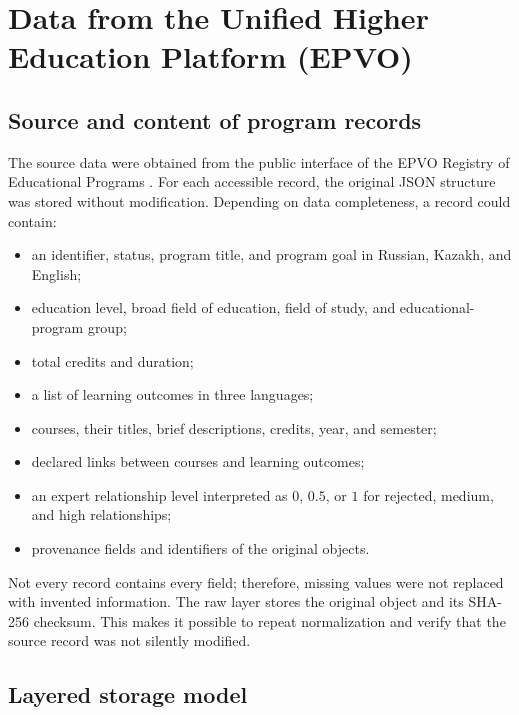 \documentclass[twoside,11pt]{article}
\begin{document}
\section{Data from the Unified Higher Education Platform (EPVO)}

\subsection{Source and content of program records}

The source data were obtained from the public interface of the EPVO Registry of Educational Programs \cite{EPVORegistry}. For each accessible record, the original JSON structure was stored without modification. Depending on data completeness, a record could contain:
\begin{itemize}
  \item an identifier, status, program title, and program goal in Russian, Kazakh, and English;
  \item education level, broad field of education, field of study, and educational-program group;
  \item total credits and duration;
  \item a list of learning outcomes in three languages;
  \item courses, their titles, brief descriptions, credits, year, and semester;
  \item declared links between courses and learning outcomes;
  \item an expert relationship level interpreted as $0$, $0.5$, or $1$ for rejected, medium, and high relationships;
  \item provenance fields and identifiers of the original objects.
\end{itemize}

Not every record contains every field; therefore, missing values were not replaced with invented information. The raw layer stores the original object and its SHA-256 checksum. This makes it possible to repeat normalization and verify that the source record was not silently modified.

\subsection{Layered storage model}
\end{document}
